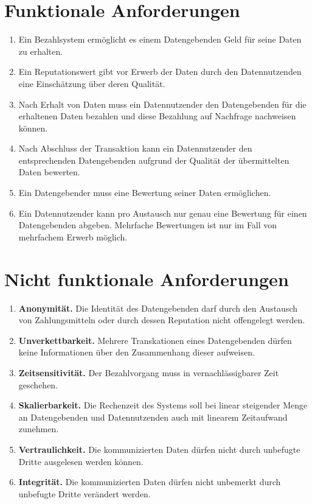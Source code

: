 \documentclass{scrreprt}
\begin{document}
\section{Funktionale Anforderungen}
\label{enum:req:funktional}
\begin{enumerate}
    \item Ein Bezahlsystem ermöglicht es einem Datengebenden Geld für seine Daten zu erhalten.
    \item Ein Reputationswert gibt vor Erwerb der Daten durch den Datennutzenden eine Einschätzung über deren Qualität.
    \item Nach Erhalt von Daten muss ein Datennutzender den Datengebenden für die erhaltenen Daten bezahlen und diese Bezahlung auf Nachfrage nachweisen können.
    \item Nach Abschluss der Transaktion kann ein Datennutzender den entsprechenden Datengebenden aufgrund der Qualität der übermittelten Daten bewerten.
    \item Ein Datengebender muss eine Bewertung seiner Daten ermöglichen.
    \item Ein Datennutzender kann pro Austausch nur genau eine Bewertung für einen Datengebenden abgeben. Mehrfache Bewertungen ist nur im Fall von mehrfachem Erwerb möglich.
\end{enumerate}

\section{Nicht funktionale Anforderungen}
\label{enum:req:nichtfunktional}
\begin{enumerate}
    \item \textbf{Anonymität.} Die Identität des Datengebenden darf durch den Austausch von Zahlungsmitteln oder durch dessen Reputation nicht offengelegt werden.
    \item \textbf{Unverkettbarkeit.} Mehrere Transkationen eines Datengebenden dürfen keine Informationen über den Zusammenhang dieser aufweisen. 
    \item \textbf{Zeitsensitivität.} Der Bezahlvorgang muss in vernachlässigbarer Zeit geschehen.
    \item \textbf{Skalierbarkeit.} Die Rechenzeit des Systems soll bei linear steigender Menge an Datengebenden und Datennutzenden auch mit linearem Zeitaufwand zunehmen.
    \item \textbf{Vertraulichkeit.} Die kommunizierten Daten dürfen nicht durch unbefugte Dritte ausgelesen werden können.
    \item \textbf{Integrität.} Die kommunizierten Daten dürfen nicht unbemerkt durch unbefugte Dritte verändert werden.
\end{enumerate}
\end{document}
